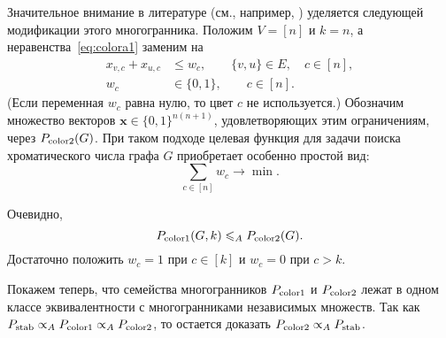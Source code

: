 Значительное внимание в литературе (см., например, \cite{Mendez:2008,Burke:2010}) уделяется следующей модификации этого многогранника.
Положим $V = [n]$ и $k = n$, а неравенства~\eqref{eq:colora1} заменим на 
\begin{align*}
x_{v,c} + x_{u,c} &\le w_c, \qquad \{v,u\} \in E, \quad c\in[n],\\
w_c &\in \{0,1\}, \qquad c\in[n].
\end{align*}
(Если переменная $w_c$ равна нулю, то цвет $c$ не используется.)
Обозначим множество векторов $\bm{x} \in \{0,1\}^{n(n+1)}$, удовлетворяющих этим ограничениям, через $P_{\textup{color2}}(G)$.
При таком подходе целевая функция для задачи поиска хроматического числа графа $G$ приобретает особенно простой вид:
\[
\sum_{c\in[n]} w_c \to \min.
\]

Очевидно, 
\[
P_{\textup{color1}}(G,k) \leqslant_A P_{\textup{color2}}(G).
\]
Достаточно положить $w_c = 1$ при $c\in[k]$ и $w_c = 0$ при $c > k$.

Покажем теперь, что семейства многогранников $P_{\textup{color1}}$ и $P_{\textup{color2}}$ лежат в одном классе эквивалентности с многогранниками независимых множеств.
Так как $P_{\textup{stab}} \propto_A P_{\textup{color1}} \propto_A P_{\textup{color2}}$, то остается доказать $P_{\textup{color2}} \propto_A P_{\textup{stab}}$.

